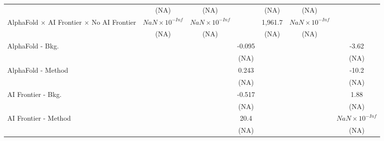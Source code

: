 \begin{tabular}{lcccccc}
                                                                              & (NA)                   & (NA)                   &                        & (NA)    & (NA)                   &   \\   
   AlphaFold $\times$ AI Frontier $\times$ No AI Frontier                     & $NaN\times 10^{-Inf}$  & $NaN\times 10^{-Inf}$  &                        & 1,961.7 & $NaN\times 10^{-Inf}$  &   \\   
                                                                              & (NA)                   & (NA)                   &                        & (NA)    & (NA)                   &   \\   
   AlphaFold - Bkg.                                                           &                        &                        & -0.095                 &         &                        & -3.62\\   
                                                                              &                        &                        & (NA)                   &         &                        & (NA)\\   
   AlphaFold - Method                                                         &                        &                        & 0.243                  &         &                        & -10.2\\   
                                                                              &                        &                        & (NA)                   &         &                        & (NA)\\   
   AI Frontier - Bkg.                                                         &                        &                        & -0.517                 &         &                        & 1.88\\   
                                                                              &                        &                        & (NA)                   &         &                        & (NA)\\   
   AI Frontier - Method                                                       &                        &                        & 20.4                   &         &                        & $NaN\times 10^{-Inf}$\\    
                                                                              &                        &                        & (NA)                   &         &                        & (NA)\\   

\end{tabular}
